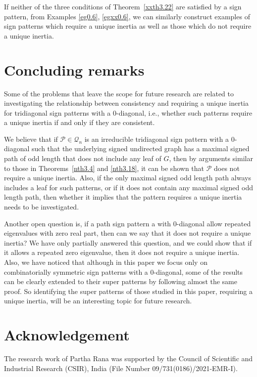 \documentclass[a4paper, 10pt]{article}
\numberwithin{equation}{section}
\begin{document}
If neither of the three conditions of Theorem~\ref{xxth3.22} are satisfied by a sign pattern, from Examples \ref{eg0.6}, \ref{egxx0.6}, we can similarly construct examples of sign patterns which require a unique inertia as well as those which do not require a unique inertia.



\section{Concluding remarks}\label{s5}

Some of the problems that leave the scope for future research are related to investigating the relationship between consistency and requiring a unique inertia for tridiagonal sign patterns with a $0$-diagonal, i.e., whether such patterns require a unique inertia if and only if they are consistent.

We believe that if $\mathcal{P}\in \mathcal{Q}_n$ is an irreducible tridiagonal sign pattern with a $0$-diagonal such that the underlying signed undirected graph has a maximal signed path of odd length that does not include any leaf of $G$, then by arguments similar to those in Theorems~\ref{nth3.4} and \ref{nth3.18}, it can be shown that $\mathcal{P}$ does not require a unique inertia.
Also, if the only maximal signed odd length path always includes a leaf for such patterns, or if it does not contain any maximal signed odd length path, then whether it implies that the pattern requires a unique inertia needs to be investigated.

Another open question is, if a path sign pattern a with $0$-diagonal allow repeated eigenvalues with zero real part, then can we say that it does not require a unique inertia? We have only partially answered this question, and we could show that if it allows a repeated zero eigenvalue, then it does not require a unique inertia.
Also, we have noticed that although in this paper we focus only on combinatorially symmetric sign patterns with a $0$-diagonal, some of the results can be clearly extended to their super patterns by following almost the same proof. So identifying the super patterns of those studied in this paper, requiring a unique inertia, will be an interesting topic for future research. 










\section{Acknowledgement} The research work of Partha Rana was supported by the Council of Scientific and Industrial Research (CSIR), India (File Number 09/731(0186)/2021-EMR-I).
\end{document}
